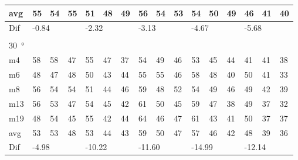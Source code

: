 \begin{table}[H]
\begin{tabular}{l|l|l|l|l|l|l|l|l|l|l|l|l|lll}
avg & 55     &  54    &  55    &  51    &  48    &   49   &  56    &  54     & 53     &  54     &  50    &   49   & \multicolumn{1}{l|}{46} & \multicolumn{1}{l|}{41}  &40  \\ \hline  
Dif & \multicolumn{3}{l|}{-0.84} & \multicolumn{3}{l|}{-2.32} & \multicolumn{3}{l|}{-3.13} & \multicolumn{3}{l|}{-4.67} & \multicolumn{3}{l}{-5.68}  \\ 
 \multicolumn{16}{l}{ } \\                         
\SI{30}{\degree}   & \multicolumn{3}{l|}{} & \multicolumn{3}{l|}{} & \multicolumn{3}{l|}{} & \multicolumn{3}{l|}{} & \multicolumn{3}{l}{}   \\  \hline
m4    &  58    &  58    & 47     & 55     &  47    &   37   &   54   &   49    &  46    &   53    &   45   &   44   & \multicolumn{1}{l|}{41} & \multicolumn{1}{l|}{41} & 38 \\
m6    &  48    &   47   &  48    & 50     &   43   &  44    &    55  &   55    &  46    &   58    &   48   &   40   & \multicolumn{1}{l|}{50} & \multicolumn{1}{l|}{41} & 33 \\
m8    &  56    &  54    & 54     &  51    &  44    &   46   &   59   &   48    &  52    &   54    &    49  &   46   & \multicolumn{1}{l|}{49} & \multicolumn{1}{l|}{42} & 39 \\
m13  &   56   & 53     &   47   & 54     &   45   &   42   &   61   &   50    &  45    &   59    &   47   &   38   & \multicolumn{1}{l|}{49} & \multicolumn{1}{l|}{37} & 32 \\
m19  &  48    &  54    &  45    &  55    &  42    &   44   &   64   &    46   &  47    &   61    &   43   &    41  & \multicolumn{1}{l|}{50} & \multicolumn{1}{l|}{37} & 37 \\ \hline
avg &  53    &   53   &  48    &  53    &  44    & 43     &  59    &   50    & 47     &   57    & 46     &   42   & \multicolumn{1}{l|}{48} & \multicolumn{1}{l|}{39}  &36  \\ \hline  
Dif & \multicolumn{3}{l|}{-4.98} & \multicolumn{3}{l|}{-10.22} & \multicolumn{3}{l|}{-11.60} & \multicolumn{3}{l|}{-14.99} & \multicolumn{3}{l}{-12.14}                              
\end{tabular}
\end{table}



